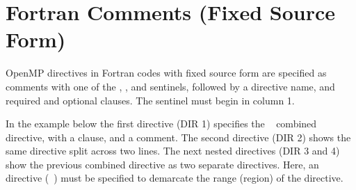 \section{Fortran Comments (Fixed Source Form)}
\label{sec:fortran_fixed_format_comments}

OpenMP directives in Fortran codes with fixed source form are specified as comments with one of the
, , and  sentinels, followed by a
directive name, and required and optional clauses.  The sentinel must begin in column 1.

In the example below the first directive (DIR 1) specifies the %
~ combined directive, with a  clause, and a comment.
The second directive (DIR 2) shows the same directive split
across two lines. The next nested directives (DIR 3 and 4) show the previous combined directive as
two separate directives. 
Here, an  directive (~) must be specified to demarcate the range (region)
of the  directive.

